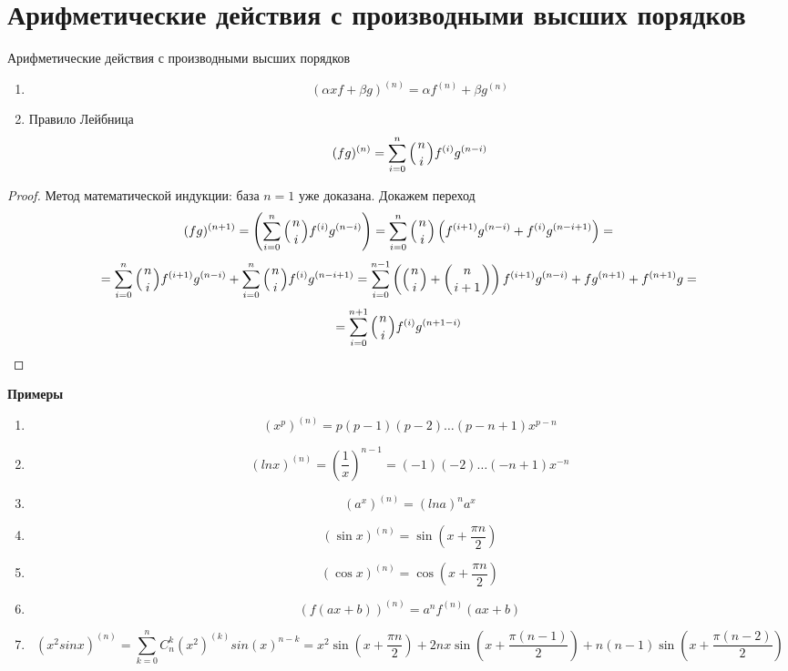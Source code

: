 \section{Арифметические действия с производными высших порядков}

\begin{theorem}{Арифметические действия с производными высших порядков}
\begin{enumerate}
\item 
$$ (\alpha x f + \beta g)^{(n)} = \alpha f^{(n)} + \beta g^{(n)} $$
\item Правило Лейбница
$$ (fg)^{(n)} = \sum_{i=0}^n {\left(n \atop i\right)} f^{(i)} g^{(n-i)} $$
\end{enumerate}
\end{theorem}
\begin{proof}
Метод математической индукции: база $n=1$ уже доказана. Докажем переход
$$ (fg)^{(n+1)} = \left( \sum_{i=0}^{n} {\left(n \atop i\right)} f^{(i)} g^{(n-i)} \right) = \sum_{i=0}^{n} {\left(n \atop i\right)} \left(f^{(i+1)} g^{(n-i)} + f^{(i)} g^{(n-i+1)}\right) = $$ 
$$ = \sum_{i=0}^n {\left(n \atop i\right)} f^{(i+1)} g^{(n-i)} + \sum_{i=0}^n {\left(n \atop i\right)} f^{(i)} g^{(n-i+1)} = \sum_{i=0}^{n-1} \left({\left(n \atop i\right)} + {\left(n \atop i + 1\right)}\right) f^{(i+1)} g^{(n-i)} + fg^{(n+1)} + f^{(n+1)}g = $$
$$ = \sum_{i=0}^{n+1} {\left(n \atop i\right)} f^{(i)}g^{(n+1-i)} $$
\end{proof}

{\bf Примеры}
\begin{enumerate}
\item $$(x^p)^{(n)} = p(p - 1)(p - 2)\ldots(p - n + 1)x^{p - n}$$
\item $$(ln x)^{(n)} = (\frac{1}{x})^{n - 1} = (-1)(-2)\ldots(-n + 1)x^{-n} $$
\item $$(a^x)^{(n)} = (ln a)^n a^x $$
\item $$(\sin x)^{(n)} = \sin(x + \frac{\pi n}{2})$$
\item $$(\cos x)^{(n)} = \cos(x + \frac{\pi n}{2})$$
\item $$(f(ax + b))^{(n)} = a^nf^{(n)}(ax + b)$$
\item $$(x^2 sin x)^{(n)} = \sum_{k = 0}^{n}C_n^k(x^2)^{(k)}sin(x)^{n - k} = x^2\sin(x + \frac{\pi n}{2}) + 2nx\sin(x + \frac{\pi(n - 1)}{2}) + n(n - 1) \sin(x + \frac{\pi (n - 2)}{2})$$
\end{enumerate}